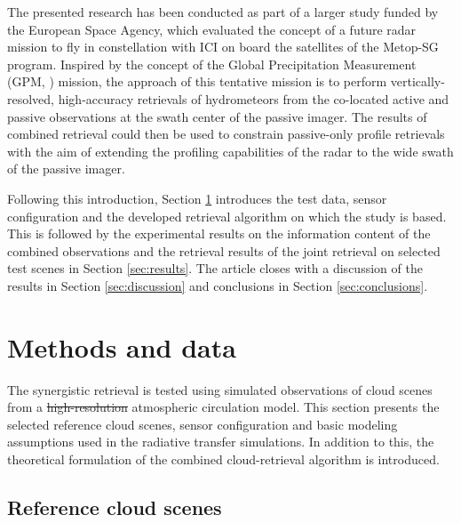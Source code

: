 \documentclass[journal abbreviation, manuscript]{copernicus}
\providecommand{\DIFadd}[1]{{\protect\color{blue}\uwave{#1}}} %
\providecommand{\DIFdel}[1]{{\protect\color{red}\sout{#1}}}                      %
\providecommand{\DIFaddbegin}{} %
\providecommand{\DIFaddend}{} %
\providecommand{\DIFdelbegin}{} %
\providecommand{\DIFdelend}{} %
\begin{document}
The presented research has been conducted as part of a larger study funded by
the European Space Agency, which evaluated the concept of a future radar mission
to fly in constellation with ICI on board the satellites of the Metop-SG
program. Inspired by the concept of the Global Precipitation Measurement (GPM,
\cite{hou14}) mission, the approach of this tentative mission is to perform
vertically-resolved, high-accuracy retrievals of hydrometeors from the
co-located active and passive observations at the swath center of the passive
imager. The results of combined retrieval could then be used to constrain
passive-only profile retrievals with the aim of extending the profiling
capabilities of the radar to the wide swath of the passive imager.

Following this introduction, Section \ref{sec:methods_and_data} introduces the
test data, sensor configuration and the developed retrieval algorithm on which
the study is based. This is followed by the experimental results on the
information content of the combined observations and the retrieval results of
the joint retrieval on selected test scenes in Section \ref{sec:results}. The
article closes with a discussion of the results in Section \ref{sec:discussion}
and conclusions in Section \ref{sec:conclusions}.


\section{Methods and data}
\label{sec:methods_and_data}

The synergistic retrieval is tested using simulated observations of cloud scenes
from a \DIFdelbegin \DIFdel{high-resolution }\DIFdelend \DIFaddbegin \DIFadd{cloud-resolving }\DIFaddend atmospheric circulation model. This section presents the
selected reference cloud scenes, sensor configuration and basic modeling
assumptions used in the radiative transfer simulations. In addition to this, the
theoretical formulation of the combined cloud-retrieval algorithm is introduced.

\subsection{Reference cloud scenes}
\end{document}

